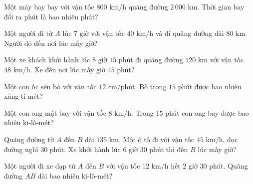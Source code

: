 \begin{ex}
  Một máy bay bay với vận tốc $800\text{ km/h}$ quãng đường $2\,000\text{ km}$. Thời gian bay đổi ra phút là bao nhiêu phút?
\end{ex}

\begin{ex}
  Một người đi từ $A$ lúc $7\text{ giờ}$ với vận tốc $40\text{ km/h}$ và đi quãng đường dài $80\text{ km}$. Người đó đến nơi lúc mấy giờ?
\end{ex}

\begin{ex}
  Một xe khách khởi hành lúc $8\text{ giờ } 15\text{ phút}$ đi quãng đường $120\text{ km}$ với vận tốc $48\text{ km/h}$. Xe đến nơi lúc mấy giờ $45$ phút?
\end{ex}

\begin{ex}
  Một con ốc sên bò với vận tốc $12\text{ cm/phút}$. Bò trong $15$ phút được bao nhiêu xăng-ti-mét?
\end{ex}

\begin{ex}
  Một con ong mật bay với vận tốc $8\text{ km/h}$. Trong $15$ phút con ong bay được bao nhiêu ki-lô-mét?
\end{ex}

\begin{ex}
  Quãng đường từ $A$ đến $B$ dài $135\text{ km}$. Một ô tô đi với vận tốc $45\text{ km/h}$, dọc đường nghỉ $30$ phút. Xe khởi hành lúc $6\text{ giờ } 30\text{ phút}$ thì đến $B$ lúc mấy giờ?
\end{ex}

\begin{ex}
  Một người đi xe đạp từ $A$ đến $B$ với vận tốc $12\text{ km/h}$ hết $2$ giờ $30$ phút. Quãng đường $AB$ dài bao nhiêu ki-lô-mét?
\end{ex}

